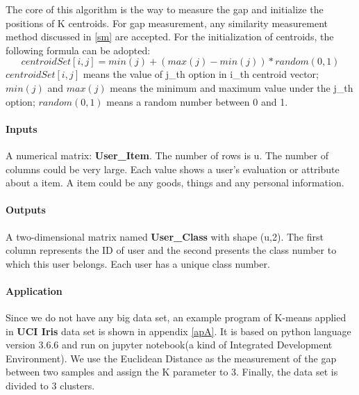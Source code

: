 The core of this algorithm is the way to measure the gap and initialize the positions of K centroids. For gap measurement, any similarity measurement method discussed in \ref{sm} are accepted. For the initialization of centroids, the following formula can be adopted:
\begin{equation}
	 centroidSet[i,j] = min(j)+(max(j)-min(j))*random(0,1)
\end{equation}
$centroidSet[i,j]$ means the value of j\_th option in i\_th centroid vector; $min(j)$ and $max(j)$ means the minimum and maximum value under the j\_th option; $random(0,1)$ means a random number between 0 and 1.

\paragraph{Inputs} A numerical matrix: \textbf{User\_Item}. The number of rows is u. The number of columns could be very large. Each value shows a user's evaluation or attribute about a item. A item could be any goods, things and any personal information.  
\paragraph{Outputs} A two-dimensional matrix named \textbf{User\_Class} with shape (u,2). The first column represents the ID of user and the second presents the class number to which this user belongs. Each user has a unique class number.

\paragraph{Application}
Since we do not have any big data set, an example program of K-means applied in \textbf{UCI Iris} data set is shown in appendix \ref{apA}. It is based on python language version 3.6.6 and run on jupyter notebook(a kind of Integrated Development Environment). We use the Euclidean Distance as the measurement of the gap between two samples and assign the K parameter to 3. Finally, the data set is divided to 3 clusters.


